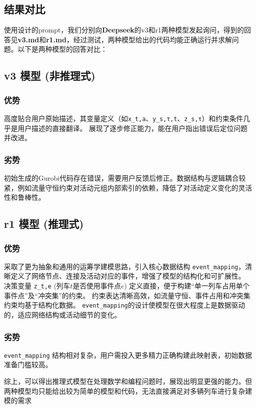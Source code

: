 \documentclass{article}
\begin{document}
    \subsection{结果对比}
    使用设计的prompt，我们分别向\textbf{Deepseek}的v3和r1两种模型发起询问，得到的回答见\textbf{v3.md}和\textbf{r1.md}，经过测试，两种模型给出的代码均能正确运行并求解问题。以下是两种模型的回答对比：
    \subsection*{v3 模型 (非推理式)}
    \subsubsection*{优势}
    高度贴合用户原始描述，其变量定义（如\texttt{x\_t,a}、\texttt{y\_s,τ,t}、\texttt{z\_s,τ}）和约束条件几乎是用户描述的直接翻译。 展现了逐步修正能力，能在用户指出错误后定位问题并改进。

    \subsubsection*{劣势}
    初始生成的Gurobi代码存在错误，需要用户反馈后修正。数据结构与逻辑耦合较紧，例如流量守恒约束对活动元组内部索引的依赖，降低了对活动定义变化的灵活性和鲁棒性。


    \subsection*{r1 模型 (推理式)}
    \subsubsection*{优势}
    采取了更为抽象和通用的运筹学建模思路，引入核心数据结构 \texttt{event\_mapping}，清晰定义了网络节点、连接及活动对应的事件，增强了模型的结构化和可扩展性。
    决策变量 \texttt{z\_t,e} (列车\(t\)是否使用事件点\(e\)) 定义直接，便于构建“单一列车占用单个事件点”及“冲突集”的约束。
    约束表达清晰高效，如流量守恒、事件占用和冲突集约束均基于结构化数据。
    \texttt{event\_mapping}的设计使模型在很大程度上是数据驱动的，适应网络结构或活动细节的变化。

    \subsubsection*{劣势}
    \texttt{event\_mapping} 结构相对复杂，用户需投入更多精力正确构建此映射表，初始数据准备门槛较高。

    综上，可以得出推理式模型在处理数学和编程问题时，展现出明显更强的能力。但两种模型均只能给出较为简单的模型和代码，无法直接满足对多辆列车进行复杂建模的需求
\end{document}
